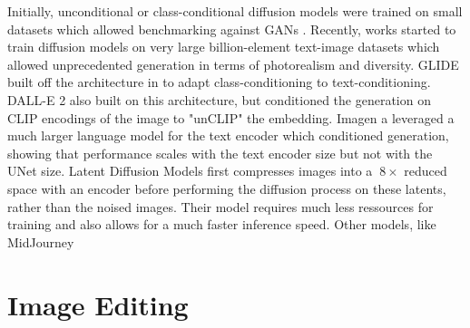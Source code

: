 Initially, unconditional or class-conditional diffusion models were trained on small 
datasets which allowed benchmarking against \ac{GAN}s \cite{ho2020denoising, dhariwal2021diffusion}.
Recently, works started to train diffusion models on very large billion-element text-image 
datasets \citep{schuhmann2022laion} which allowed unprecedented generation  in terms of 
photorealism and diversity. GLIDE \citep{nichol2021glide} built off the architecture in 
\cite{dhariwal2021diffusion} to adapt class-conditioning to text-conditioning. DALL-E 2 \citep{ramesh2022hierarchical}
also built on this architecture, but conditioned the generation on  CLIP \cite{radford2021learning}
encodings of the image to "unCLIP" the embedding. Imagen \citep{saharia2022photorealistic} a leveraged 
a much larger language model for the text encoder which conditioned generation, showing that 
performance scales with the text encoder size but not with the UNet size. Latent Diffusion Models \citep{rombach2022high}
first compresses images into a $~8\times$ reduced space with an encoder before performing the 
diffusion process on these latents, rather than the noised images. Their model requires much 
less ressources for training and also allows for a much faster inference speed. Other models, 
like MidJourney


\section{Image Editing}\label{section:image_editing}

